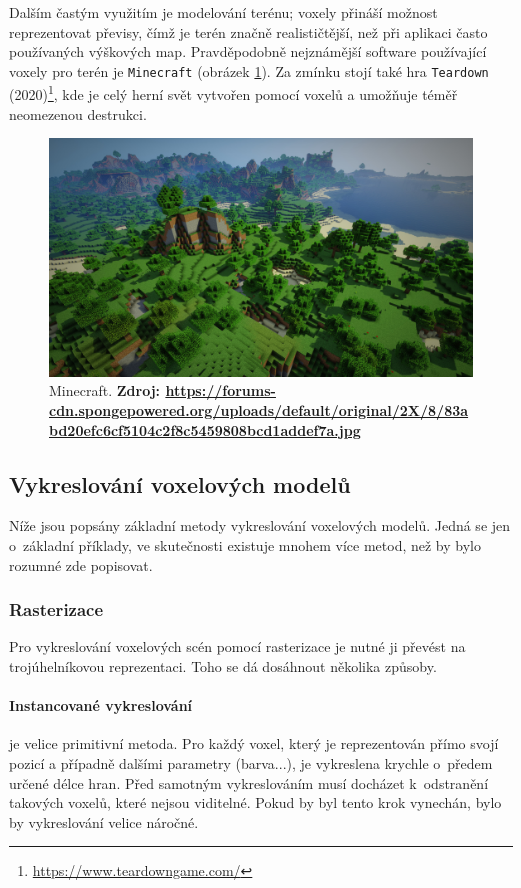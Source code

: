 Dalším častým využitím je modelování terénu; voxely přináší možnost reprezentovat převisy, čímž je terén značně realističtější, než při aplikaci často používaných výškových map. Pravděpodobně nejznámější software používající voxely pro terén je \texttt{Minecraft} (obrázek \ref{fig:minecraft}). Za zmínku stojí také hra \texttt{Teardown} (2020)\footnote{\url{https://www.teardowngame.com/}}, kde je celý herní svět vytvořen pomocí voxelů a umožňuje téměř neomezenou destrukci.

\begin{figure}[H]
	\centering
	\includegraphics[scale=0.15]{obrazky-figures/minecraft.jpg}
	\caption{Minecraft. \textbf{Zdroj: \url{https://forums-cdn.spongepowered.org/uploads/default/original/2X/8/83abd20efc6cf5104c2f8c5459808bcd1addef7a.jpg}}}
	\label{fig:minecraft}
\end{figure}

\subsection{Vykreslování voxelových modelů}
Níže jsou popsány základní metody vykreslování voxelových modelů. Jedná se jen o~základní příklady, ve skutečnosti existuje mnohem více metod, než by bylo rozumné zde popisovat.

\subsubsection{Rasterizace}
Pro vykreslování voxelových scén pomocí rasterizace je nutné ji převést na trojúhelníkovou reprezentaci. Toho se dá dosáhnout několika způsoby.

\paragraph{Instancované vykreslování} je velice primitivní metoda. Pro každý voxel, který je reprezentován přímo svojí pozicí a případně dalšími parametry (barva...), je vykreslena krychle o~předem určené délce hran. Před samotným vykreslováním musí docházet k~odstranění takových voxelů, které nejsou viditelné. Pokud by byl tento krok vynechán, bylo by vykreslování velice náročné. \cite{nousiainen_2019}

